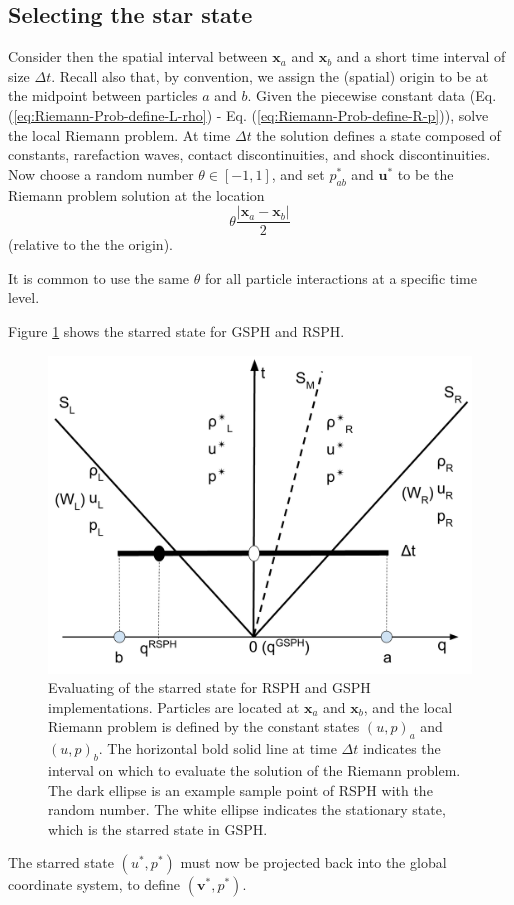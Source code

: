 \subsection{Selecting the star state} \label{sec:Picking-up-single-state}
Consider then the spatial interval between $\textbf{x}_{a}$ and $\textbf{x}_{ b}$ and a short time interval of size $\Delta t$. Recall also that, by convention, we assign the (spatial) origin to be at the midpoint between particles $a$ and $b$.
Given the piecewise constant data (Eq. (\ref{eq:Riemann-Prob-define-L-rho}) - Eq. (\ref{eq:Riemann-Prob-define-R-p})), solve the local Riemann problem. At time $\Delta t$ the solution defines a state composed of constants, rarefaction waves, contact discontinuities, and shock discontinuities. 
Now choose a random number $\theta \in [-1,1]$, and set $p_{a b}^{\ast}$ and $\textbf{u}^{\ast}$ to be the Riemann problem solution at the location 
$$
\theta \frac{|\textbf{x}_{a} - \textbf{x}_{ b}|}{2}
$$
(relative to the the origin).

It is common to use the same $\theta$ for all particle interactions at a specific time level.

Figure \ref{fig:pick-up-state-GSPH-RSPH} shows the starred state for GSPH and RSPH.
\begin{figure}
    \center
	\includegraphics[width=0.5 \textwidth]{./Chapter-4/Figures/RSPH-GSPH}
    \caption{Evaluating of the starred state for  RSPH and GSPH implementations.
Particles are located at $\textbf{x}_{a} $ and $ \textbf{x}_{ b}$, and the local Riemann problem is defined by the constant states $(u, p)_a$ and $(u,p)_b$. The horizontal bold solid line at time $\Delta t$ indicates the interval on which to evaluate the solution of the Riemann problem. The dark ellipse is an example sample point of RSPH with the random number. The white ellipse indicates the stationary state, which is the starred state in GSPH.}
    \label{fig:pick-up-state-GSPH-RSPH}
\end{figure}

The starred state $(u^{\ast},  p^{\ast})$ must now be projected back into the global coordinate system, to define  $(\textbf{v}^{\ast},  p^{\ast})$.

